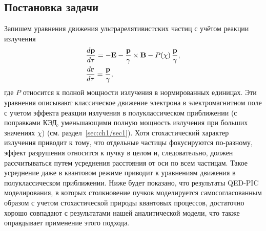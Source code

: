 \subsection{Постановка задачи}
\label{sec:ch3/sec/Base}

Запишем уравнения движения ультрарелятивистских частиц с учётом реакции излучения
\begin{align}
    &\frac{d\vb{p}}{d\tau}  = - \vb{E} - \frac{\vb{p}}{\gamma} \times \vb{B}  - P(\chi) \,\frac{\vb{p}}{\gamma}, \label{eq:ch3/p1} \\
    &\frac{d\vb{r}}{d\tau}  = \frac{\vb{p}}{\gamma},
\end{align}
где $P$ относится к полной мощности излучения в нормированных единицах.
Эти уравнения описывают классическое движение электрона в электромагнитном поле с учетом эффекта реакции излучения в полуклассическом приближении (с поправками КЭД, уменьшающими полную мощность излучения при больших значениях $\chi$) (см. раздел~\ref{sec:ch1/sec1}).
Хотя стохастический характер излучения приводит к тому, что отдельные частицы фокусируются по-разному, эффект разрушения относится к пучку в целом и, следовательно, должен рассчитываться путем усреднения расстояния от оси по всем частицам.
Такое усреднение даже в квантовом режиме приводит к уравнениям движения в полуклассическом приближении.
Ниже будет показано, что результаты QED-PIC моделирования, в которых столкновение пучков моделируется самосогласованным образом с учетом стохастической природы квантовых процессов, достаточно хорошо совпадают с результатами нашей аналитической модели, что также оправдывает применение этого подхода.

